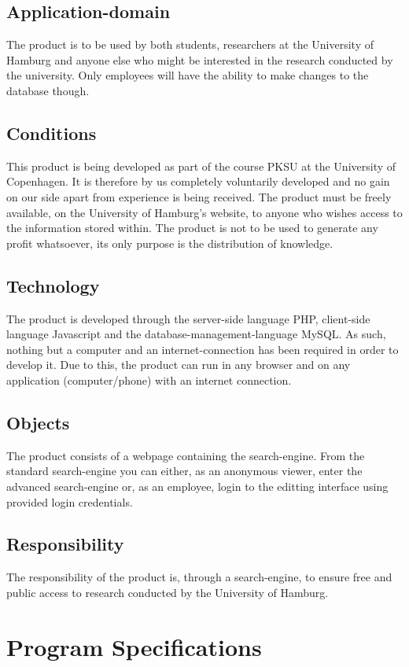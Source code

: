 \documentclass[12pt,a4paper]{article}
\begin{document}
\subsection{Application-domain}
The product is to be used by both students, researchers at the University of Hamburg and anyone else who might be interested in the research conducted by the university. Only employees will have the ability to make changes to the database though.
\subsection{Conditions}
This product is being developed as part of the course PKSU at the University of Copenhagen. It is therefore by us completely voluntarily developed and no gain on our side apart from experience is being received. 
The product must be freely available, on the University of Hamburg's website, to anyone who wishes access to the information stored within. The product is not to be used to generate any profit whatsoever, its only purpose is the distribution of knowledge.
\subsection{Technology}
The product is developed through the server-side language PHP, client-side language Javascript and the database-management-language MySQL. As such, nothing but a computer and an internet-connection has been required in order to develop it.
Due to this, the product can run in any browser and on any application (computer/phone) with an internet connection.
\subsection{Objects}
The product consists of a webpage containing the search-engine. From the standard search-engine you can either, as an anonymous viewer, enter the advanced search-engine or, as an employee, login to the editting interface using provided login credentials.
\subsection{Responsibility}
The responsibility of the product is, through a search-engine, to ensure free and public access to research conducted by the University of Hamburg. 
\newpage
\section{Program Specifications}
\end{document}
